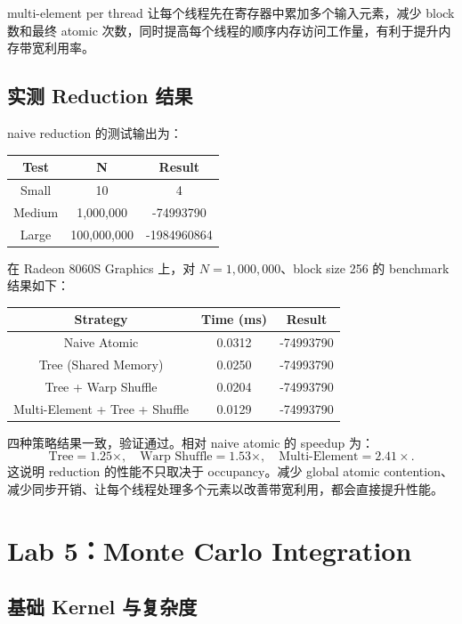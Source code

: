 \documentclass[UTF8,a4paper,12pt,fontset=none]{ctexart}
\begin{document}
multi-element per thread 让每个线程先在寄存器中累加多个输入元素，减少 block 数和最终 atomic 次数，同时提高每个线程的顺序内存访问工作量，有利于提升内存带宽利用率。

\subsection{实测 Reduction 结果}

naive reduction 的测试输出为：

\begin{center}
\begin{tabular}{ccc}
\toprule
Test & N & Result \\
\midrule
Small  & 10          & 4 \\
Medium & 1,000,000   & -74993790 \\
Large  & 100,000,000 & -1984960864 \\
\bottomrule
\end{tabular}
\end{center}

在 Radeon 8060S Graphics 上，对 $N=1,000,000$、block size 256 的 benchmark 结果如下：

\begin{center}
\begin{tabular}{ccc}
\toprule
Strategy & Time (ms) & Result \\
\midrule
Naive Atomic                       & 0.0312 & -74993790 \\
Tree (Shared Memory)               & 0.0250 & -74993790 \\
Tree + Warp Shuffle                & 0.0204 & -74993790 \\
Multi-Element + Tree + Shuffle     & 0.0129 & -74993790 \\
\bottomrule
\end{tabular}
\end{center}

四种策略结果一致，验证通过。相对 naive atomic 的 speedup 为：
\[
  \text{Tree}=1.25\times,\quad
  \text{Warp Shuffle}=1.53\times,\quad
  \text{Multi-Element}=2.41\times.
\]
这说明 reduction 的性能不只取决于 occupancy。减少 global atomic contention、减少同步开销、让每个线程处理多个元素以改善带宽利用，都会直接提升性能。

\section{Lab 5：Monte Carlo Integration}

\subsection{基础 Kernel 与复杂度}
\end{document}
